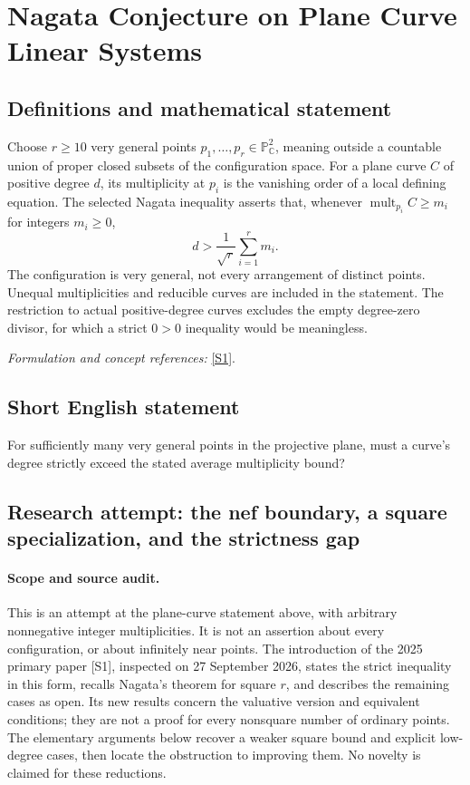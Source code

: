 \documentclass[11pt]{article}
\begin{document}
\section*{\texorpdfstring{Nagata Conjecture on Plane Curve Linear Systems}{Nagata Conjecture on Plane Curve Linear Systems}}\label{30006987}
\subsection{Definitions and mathematical statement}
Choose $r\ge10$ very general points $p_1,\ldots,p_r\in{\mathbb{P}}^2_{{\mathbb{C}}}$, meaning outside a countable union of proper closed subsets of the configuration space. For a plane curve $C$ of positive degree $d$, its multiplicity at $p_i$ is the vanishing order of a local defining equation. The selected Nagata inequality asserts that, whenever $\operatorname{mult}_{p_i}C\ge m_i$ for integers $m_i\ge0$,
\[
 d>\frac1{\sqrt r}\sum_{i=1}^r m_i.
\]
The configuration is very general, not every arrangement of distinct points. Unequal multiplicities and reducible curves are included in the statement. The restriction to actual positive-degree curves excludes the empty degree-zero divisor, for which a strict $0>0$ inequality would be meaningless.
\par\smallskip\textit{Formulation and concept references:} \href{https://link.springer.com/article/10.1007/s40687-025-00500-2}{[S1]}.

\subsection{Short English statement}
For sufficiently many very general points in the projective plane, must a curve's degree strictly exceed the stated average multiplicity bound?
\subsection{Research attempt: the nef boundary, a square specialization, and the strictness gap}
\paragraph{Scope and source audit.}
This is an attempt at the plane-curve statement above, with arbitrary nonnegative integer multiplicities. It is not an assertion about every configuration, or about infinitely near points. The introduction of the 2025 primary paper [S1], inspected on 27 September 2026, states the strict inequality in this form, recalls Nagata's theorem for square $r$, and describes the remaining cases as open. Its new results concern the valuative version and equivalent conditions; they are not a proof for every nonsquare number of ordinary points. The elementary arguments below recover a weaker square bound and explicit low-degree cases, then locate the obstruction to improving them. No novelty is claimed for these reductions.
\end{document}
